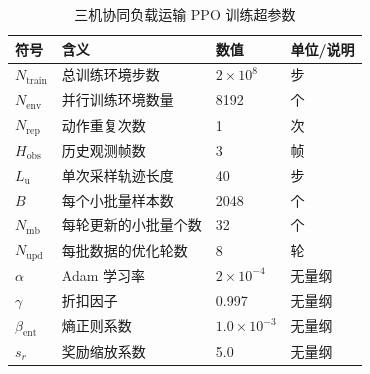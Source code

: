 \begin{table}[htbp]
    \centering
    \caption{三机协同负载运输 PPO 训练超参数}
    \label{tab:triquad_train_setup}
    \renewcommand{\arraystretch}{1.15}
    \begin{tabular}{p{}p{}p{}p{}}
        \toprule
        符号 & 含义 & 数值 & 单位/说明 \\
        \midrule
        $N_{\mathrm{train}}$ & 总训练环境步数 & $2\times 10^8$ & 步 \\
        $N_{\mathrm{env}}$ & 并行训练环境数量 & 8192 & 个 \\
        $N_{\mathrm{rep}}$ & 动作重复次数 & 1 & 次 \\
        $H_{\mathrm{obs}}$ & 历史观测帧数 & 3 & 帧 \\
        $L_{\mathrm{u}}$ & 单次采样轨迹长度 & 40 & 步 \\
        $B$ & 每个小批量样本数 & 2048 & 个 \\
        $N_{\mathrm{mb}}$ & 每轮更新的小批量个数 & 32 & 个 \\
        $N_{\mathrm{upd}}$ & 每批数据的优化轮数 & 8 & 轮 \\
        $\alpha$ & Adam 学习率 & $2\times 10^{-4}$ & 无量纲 \\
        $\gamma$ & 折扣因子 & 0.997 & 无量纲 \\
        $\beta_{\mathrm{ent}}$ & 熵正则系数 & $1.0\times 10^{-3}$ & 无量纲 \\
        $s_r$ & 奖励缩放系数 & 5.0 & 无量纲 \\
        \bottomrule
    \end{tabular}
\end{table}

